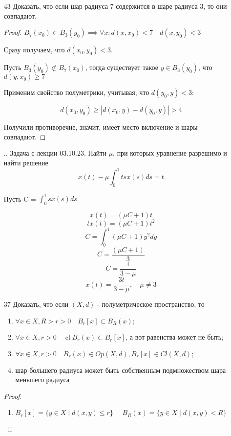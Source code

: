 \documentclass[a4paper, 12pt]{article}
\theoremstyle{definition}
\theoremstyle{remark}
\DeclareMathOperator{\clo}{cl}
\begin{document}
\begin{enumerate}
    \item[43] Доказать, что если шар радиуса 7 содержится в шаре радиуса 3, то они совпадают.
    \begin{proof}
        $B_7(x_0) \subset B_3(y_0) \implies \forall x: d(x, x_0) < 7 \quad d(x, y_0) < 3$

        Сразу получаем, что $d(x_0, y_0) < 3$.

        Пусть $B_3(y_0) \not\subset B_7(x_0)$, тогда существует такое $y\in B_3(y_0)$,
        что $d(y, x_0) \geq 7$

        Применим свойство полуметрики, учитывая, что $d(y_0, y) < 3$:

        \[d(x_0, y_0) \geq |d(x_0, y) - d(y_0, y)| > 4\]
        
        Получили противоречие, значит, имеет место включение и шары совпадают.
    \end{proof}

    \item[..] Задача с лекции 03.10.23.
    Найти $\mu$, при которых уравнение разрешимо и найти решение
    \[x(t) - \mu \int_{0}^{1} t s x(s) ds = t\]
    
    Пусть C = $\int_{0}^{1}s x(s) ds$

    \[x(t) = (\mu C + 1)t\]
    \[t x(t) = (\mu C +1)t^2\]
    \[C = \int_0^1 (\mu C +1)y^2dy\]
    \[C = \frac{(\mu C +1) }{3}\]
    \[C = \frac{1}{3-\mu}\]
    \[x(t) = \frac{3t}{3-\mu}, \quad \mu\neq 3\]

    \item[37] Доказать, что если $(X, d)$ - полуметрическое пространство,
    то
    \begin{enumerate}
        \item $\forall x\in X, R > r > 0\quad B_r[x] \subset B_R(x)$;
        \item $\forall x\in X, r > 0\quad \clo B_r(x) \subset B_r[x]$, а вот равенства может не быть;
        \item $\forall x\in X, r > 0\quad B_r(x)\in Op(X, d), B_r[x]\in Cl(X, d)$;
        \item шар большего радиуса может быть собственным подмножеством шара меньшего радиуса
    \end{enumerate}
    \begin{proof}
        \begin{enumerate}
            \item $B_r[x] = \{y\in X\;|\;d(x, y) \leq r\} \quad$
            $B_R(x) = \{y\in X\;|\;d(x, y)< R\}$


\end{enumerate}
\end{proof}
\end{enumerate}
\end{document}
